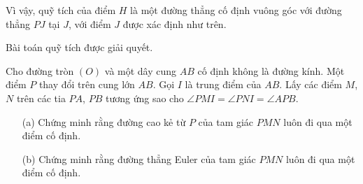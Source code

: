 \begin{solution}
\begin{enumerate}
\begin{enumerate}[leftmargin=1.25cm]
                \end{enumerate}

                Vì vậy, quỹ tích của điểm \(H\) là một đường thẳng cố định vuông góc với đường thẳng \(PJ\) tại \(J\), với điểm \(J\) được xác định như trên.
                
            \end{enumerate}

        Bài toán quỹ tích được giải quyết.
        \end{solution}

        \begin{problem}
            Cho đường tròn \((O)\) và một dây cung \(AB\) cố định không là đường kính. Một điểm \(P\) thay đổi trên cung lớn \(AB\). Gọi \(I\) là trung điểm của \(AB\). Lấy các điểm \(M\), \(N\) trên các tia \(PA\), \(PB\) tương ứng sao cho \(\angle PMI = \angle PNI = \angle APB\).
            \begin{enumerate}
                \item[(a)] Chứng minh rằng đường cao kẻ từ \(P\) của tam giác \(PMN\) luôn đi qua một điểm cố định.
                \item[(b)] Chứng minh rằng đường thẳng Euler của tam giác \(PMN\) luôn đi qua một điểm cố định.
            \end{enumerate}
        \end{problem}


